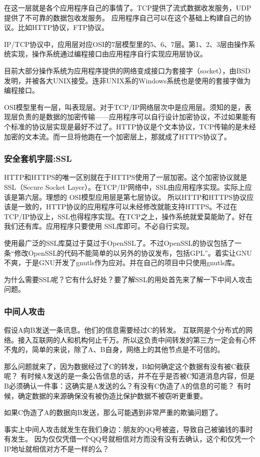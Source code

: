 在这一层就是各个应用程序自己的事情了。TCP提供了流式数据收发服务，UDP提供了不可靠的数据包收发服务。
应用程序自己可以在这个基础上构建自己的协议。比如HTTP协议，FTP协议。

IP/TCP协议中，应用层对应OSI的7层模型里的5、6、7层。第1、2、3层由操作系统实现，操作系统通过编程接口由应用程序自行实现应用层协议。

目前大部分操作系统为应用程序提供的网络变成接口为套接字（socket），由BSD发明，并被各大UNIX接受。连非UNIX系的Windows系统也是使用的套接字做为编程接口。

OSI模型里有一层，叫表现层。对于TCP/IP网络层次中是应用层。须知的是，表现层负责的是数据的加密传输——应用程序可以自行设计加密协议，不过如果能有个标准的协议层实现是最好不过了。HTTP协议是个文本协议，TCP传输的是未经加密的文本流。而一旦将他跑在一个加密层上，那就成了HTTPS协议了。

\subsubsection{安全套机字层:SSL}

HTTP和HTTPS的唯一区别就在于HTTPS使用了一层加密。这个加密协议就是SSL（Secure Socket Layer）。在TCP/IP网络中，SSL由应用程序实现。实际上应该是第六层。理想的 OSI模型应用层是第七层协议。
所以HTTP和HTTPS协议应该是一致的，HTTP协议的应用程序可以未经修改就能支持HTTPS。不过在TCP/IP协议上，SSL也得程序实现。在TCP之上，操作系统就爱莫能助了。好在我们还有库。应用程序只要使用 SSL库即可。不必自行实现。

使用最广泛的SSL库莫过于莫过于OpenSSL了。不过OpenSSL的协议包括了一条“修改OpenSSL的代码不能简单的以另外的协议发布，包括GPL”。着实让GNU不爽，于是GNU开发了gnutls作为应对。并在自己的项目中只使用gnutls库。

为什么需要SSL呢？它有什么好处？要了解SSL的用处首先来了解一下中间人攻击问题。

\begin{insertnote}
\subsubsection*{中间人攻击}

假设A向B发送一条讯息。他们的信息需要经过C的转发。
互联网是个分布式的网络。接入互联网的人和机构何止千万。所以这负责中间转发的第三方一定会有心怀不鬼的，简单的来说，除了A、B自身，网络上的其他节点是不可信的。 

那么问题就来了，因为数据经过了C的转发，B如何确定这个数据有没有被C截获呢？
有时候A发送的是一条公告信息的话，并不在乎是否被C知道消息内容，但是B必须确认一件事：这确实是A发送的么？有没有C伪造了A的信息的可能？ 有时候，确定数据的来源确保没有被伪造比保护数据不被窃听更重要。

如果C伪造了A的数据向B发送，那么可能遇到非常严重的欺骗问题了。

事实上中间人攻击就发生在我们身边：朋友的QQ号被盗，导致自己被骗钱的事时有发生。
因为仅仅凭借一个QQ号就相信对方而没有没有去确认，这个和仅凭一个IP地址就相信对方不是一样的么？

\end{insertnote}

